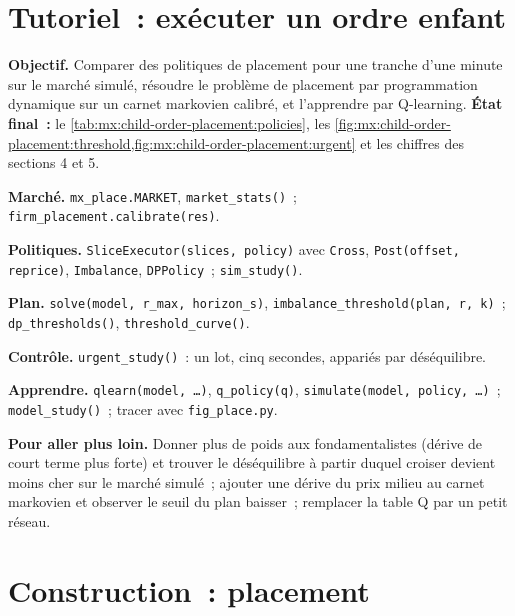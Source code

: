 \section{Tutoriel~: exécuter un ordre enfant}\label{tut:mx:child-order-placement:tut}

\begin{tutorial}
\textbf{Objectif.} Comparer des politiques de placement pour une tranche d'une minute sur le marché simulé, résoudre le problème de placement par programmation dynamique sur un
carnet markovien calibré, et l'apprendre par Q-learning.
\textbf{État final~:} le \cref{tab:mx:child-order-placement:policies}, les \cref{fig:mx:child-order-placement:threshold,fig:mx:child-order-placement:urgent}
et les chiffres des sections 4 et 5.
\begin{tutsteps}
\item \textbf{Marché.} \texttt{mx\_place.MARKET}, \texttt{market\_stats()}~; \texttt{firm\_placement.calibrate(res)}.
\item \textbf{Politiques.} \texttt{SliceExecutor(slices, policy)} avec \texttt{Cross}, \texttt{Post(offset, reprice)}, \texttt{Imbalance},
\texttt{DPPolicy}~; \texttt{sim\_study()}.
\item \textbf{Plan.} \texttt{solve(model, r\_max, horizon\_s)}, \texttt{imbalance\_threshold(plan, r, k)}~; \texttt{dp\_thresholds()},
\texttt{threshold\_curve()}.
\item \textbf{Contrôle.} \texttt{urgent\_study()}~: un lot, cinq secondes, appariés par déséquilibre.
\item \textbf{Apprendre.} \texttt{qlearn(model, \dots)}, \texttt{q\_policy(q)}, \texttt{simulate(model, policy, \dots)}~; \texttt{model\_study()}~; tracer
avec \texttt{fig\_place.py}.
\end{tutsteps}
\textbf{Pour aller plus loin.} Donner plus de poids aux fondamentalistes (dérive de court terme plus forte) et trouver le déséquilibre à partir duquel croiser devient
moins cher sur le marché simulé~; ajouter une dérive du prix milieu au carnet markovien et observer le seuil du plan baisser~; remplacer la table Q par un petit réseau.
\end{tutorial}

\section{Construction~: placement}\label{bld:mx:child-order-placement:placement}

